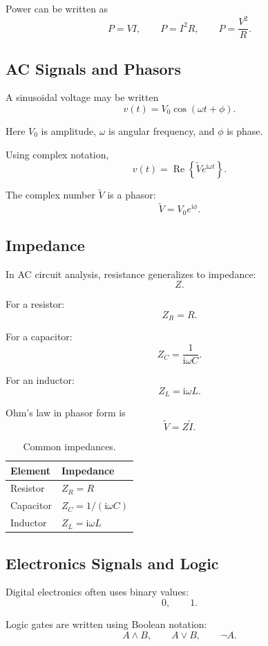 \documentclass[11pt,twocolumn]{article}
\newcommand{\ii}{\mathrm{i}}
\newcommand{\Real}{\operatorname{Re}}
\begin{document}
Power can be written as
\[
P = VI,
\qquad
P = I^2R,
\qquad
P = \frac{V^2}{R}.
\]

\subsection{AC Signals and Phasors}

A sinusoidal voltage may be written
\[
v(t)
=
V_0\cos(\omega t+\phi).
\]

Here \(V_0\) is amplitude, \(\omega\) is angular frequency, and \(\phi\) is
phase.

Using complex notation,
\[
v(t)
=
\Real\left\{
\tilde{V}e^{\ii\omega t}
\right\}.
\]

The complex number \(\tilde{V}\) is a phasor:
\[
\tilde{V}
=
V_0e^{\ii\phi}.
\]

\subsection{Impedance}

In AC circuit analysis, resistance generalizes to impedance:
\[
Z.
\]

For a resistor:
\[
Z_R = R.
\]

For a capacitor:
\[
Z_C
=
\frac{1}{\ii\omega C}.
\]

For an inductor:
\[
Z_L
=
\ii\omega L.
\]

Ohm's law in phasor form is
\[
\tilde{V}
=
Z\tilde{I}.
\]

\begin{table}[ht]
\centering
\small
\caption{Common impedances.}
\begin{tabular}{ll}
\toprule
Element & Impedance \\
\midrule
Resistor & \(Z_R=R\) \\
Capacitor & \(Z_C=1/(\ii\omega C)\) \\
Inductor & \(Z_L=\ii\omega L\) \\
\bottomrule
\end{tabular}
\end{table}

\subsection{Electronics Signals and Logic}

Digital electronics often uses binary values:
\[
0,
\qquad
1.
\]

Logic gates are written using Boolean notation:
\[
A \land B,
\qquad
A \lor B,
\qquad
\neg A.
\]
\end{document}
